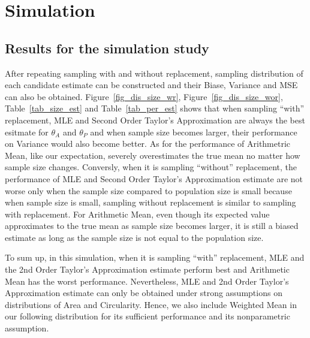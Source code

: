 \documentclass{article}\usepackage[]{graphicx}\usepackage[]{color}
\numberwithin{figure}{subsection} %
\numberwithin{table}{subsection} %
\begin{document}
\setcounter{section}{3} 
\section{Simulation}
\setcounter{subsection}{2}
\subsection{Results for the simulation study}
After repeating sampling with and without replacement, sampling distribution of each candidate estimate can be constructed and their Biase, Variance and MSE can also be obtained. Figure~\ref{fig_dis_size_wr}, Figure~\ref{fig_dis_size_wor}, Table~\ref{tab_size_est} and Table~\ref{tab_per_est} shows that when sampling ``with'' replacement, MLE and Second Order Taylor's Approximation are always the best esitmate for ${\theta}_{A}$ and ${\theta}_{P}$ and when sample size becomes larger, their performance on Variance would also become better. As for the performance of Arithmetric Mean, like our expectation, severely overestimates the true mean no matter how sample size changes. Conversly, when it is sampling ``without'' replacement, the performance of MLE and Second Order Taylor's Approximation estimate are not worse only when the sample size compared to population size is small because when sample size is small, sampling without replacement is similar to sampling with replacement. For Arithmetic Mean, even though its expected value approximates to the true mean as sample size becomes larger, it is still a biased estimate as long as the sample size is not equal to the population size.

To sum up, in this simulation, when it is sampling ``with'' replacement, MLE and the 2nd Order Taylor's Approximation estimate perform best and Arithmetic Mean has the worst performance. Nevertheless, MLE and 2nd Order Taylor's Approximation estimate can only be obtained under strong assumptions on distributions of Area and Circularity. Hence, we also include Weighted Mean in our following distribution for its sufficient performance and its nonparametric assumption. 
\end{document}
